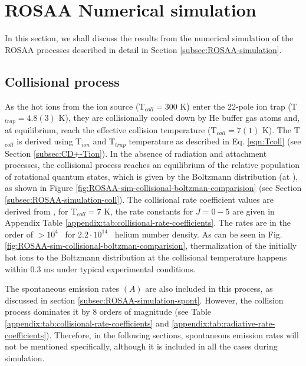 \section{ROSAA Numerical simulation}
\label{subsec:CD+-kinetics-simulation}

In this section, we shall discuss the results from the numerical simulation of
the ROSAA processes described in detail in Section
\ref{subsec:ROSAA-simulation}.

\subsection{Collisional process}
\label{subsec:CD+-kinetics-simulation-coll}

As the hot \CD ions from the ion source (T$_{coll}=300$ K) enter the 22-pole
ion trap (T$_{trap}=4.8(3)$ K), they are collisionally cooled down by He buffer
gas atoms and, at equilibrium, reach the effective collision temperature
(T$_{coll}=7(1)$ K). The T$_{coll}$ is derived using T$_{ion}$ and T$_{trap}$
temperature as described in Eq. \ref{eqn:Tcoll} (see Section
\ref{subsec:CD+-Tion}). In the absence of radiation and attachment processes,
the collisional process reaches an equilibrium of the relative population of
rotational quantum states, which is given by the Boltzmann distribution (at
\Tcoll), as shown in Figure
\ref{fig:ROSAA-sim-collisional-boltzman-comparision} (see Section
\ref{subsec:ROSAA-simulation-coll}). The collisional rate coefficient values
are derived from \citet{Werfelli2017}, for T$_{coll}=7$ K, the rate constants
for $J=0-5$ are given in Appendix Table
\ref{appendix:tab:collisional-rate-coefficients}. The rates are in the order of
$>10^4$ \pers\ for $2.2 \cdot 10^{14}$ \percc\ helium number density. As can be
seen in Fig. \ref{fig:ROSAA-sim-collisional-boltzman-comparision},
thermalization of the initially hot ions to the Boltzmann distribution at the
collisional temperature happens within 0.3 ms under typical experimental
conditions.



The spontaneous emission rates $(A)$ are also included in this process, as discussed in section \ref{subsec:ROSAA-simulation-spont}. However, the collision process dominates it by $8$ orders of magnitude (see Table \ref{appendix:tab:collisional-rate-coefficients} and \ref{appendix:tab:radiative-rate-coefficients}). Therefore, in the following sections, spontaneous emission rates will not be mentioned specifically, although it is included in all the cases during simulation.

